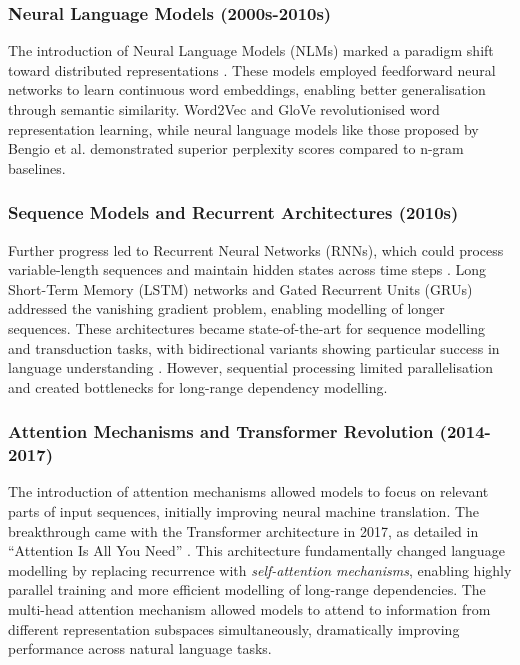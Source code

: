 \subsubsection{Neural Language Models (2000s-2010s)}
The introduction of Neural Language Models (NLMs) marked a paradigm shift toward distributed representations \citep{bengio2003neural}. These models employed feedforward neural networks to learn continuous word embeddings, enabling better generalisation through semantic similarity. Word2Vec \citep{mikolov2013word2vec} and GloVe \citep{pennington2014glove} revolutionised word representation learning, while neural language models like those proposed by Bengio et al. demonstrated superior perplexity scores compared to n-gram baselines.

\subsubsection{Sequence Models and Recurrent Architectures (2010s)}
Further progress led to Recurrent Neural Networks (RNNs), which could pro\-cess variable-length sequences and maintain hidden states across time steps \citep{elman1990finding}. Long Short-Term Memory (LSTM) networks \citep{hochreiter1997lstm} and Gated Recurrent Units (GRUs) \citep{cho2014gru} addressed the vanishing gradient problem, enabling modelling of longer sequences. These architectures became state-of-the-art for sequence modelling and transduction tasks, with bidirectional variants showing particular success in language understanding \citep{graves2005bidirectional}. However, sequential processing limited parallelisation and created bottlenecks for long-range dependency modelling.

\subsubsection{Attention Mechanisms and Transformer Revolution (2014-2017)}
The introduction of attention mechanisms \citep{bahdanau2014attention} allowed models to focus on relevant parts of input sequences, initially improving neural machine translation. The breakthrough came with the Transformer architecture in 2017, as detailed in ``Attention Is All You Need'' \citep{vaswani2017attention}. This architecture fundamentally changed language modelling by replacing recurrence with \textit{self-attention mechanisms}, enabling highly parallel training and more efficient modelling of long-range dependencies. The multi-head attention mechanism allowed models to attend to information from different representation subspaces simultaneously, dramatically improving performance across natural language tasks.

